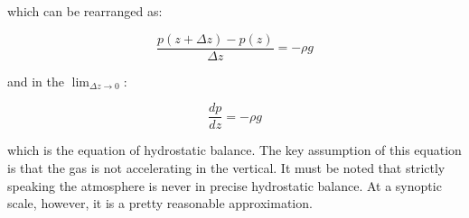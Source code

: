 which can be rearranged as:

\begin{equation}
    \frac{p(z + \Delta z) - p(z)}{\Delta z} = -\rho g
\end{equation}

and in the $\lim_{\Delta z \to 0}$:

\begin{equation}
    \frac{dp}{dz} = -\rho g
\end{equation}

which is the equation of hydrostatic balance. The key assumption of this equation is that the gas is not accelerating in the vertical. It must be noted that strictly speaking the atmosphere is never in precise hydrostatic balance\cite{iop}. At a synoptic scale, however, it is a pretty reasonable approximation. 


